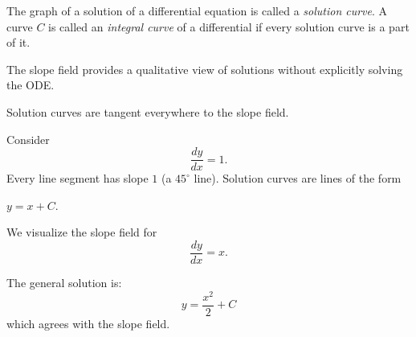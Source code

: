\begin{definition}
    The graph of a solution of a differential equation is called a \emph{solution curve}.
    A curve \(C\) is called an \emph{integral curve} of a differential if every solution curve is a part of it.
\end{definition}
\begin{compactitem}
    \item The slope field provides a qualitative view of solutions without explicitly solving the ODE.
    \item Solution curves are tangent everywhere to the slope field.
\end{compactitem}

\begin{example}
Consider
\[
\frac{dy}{dx} = 1.
\]
Every line segment has slope $1$ (a $45^\circ$ line).  
Solution curves are lines of the form

$y = x + C$.
\begin{center}
\end{center}
\end{example}

\begin{example}
We visualize the slope field for
\[
\frac{dy}{dx} = x.
\]

\begin{center}
\end{center}


The general solution is:
\[
y = \frac{x^2}{2} + C
\]
which agrees with the slope field.
\end{example}

